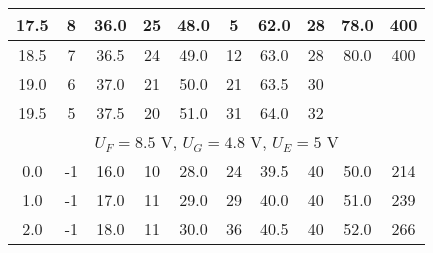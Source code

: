 \begin{table*}
\begin{ruledtabular}
\begin{tabular}{|cccccccccc|}
        \multicolumn{1}{|c|}{17.5}      & \multicolumn{1}{c|}{8}          & \multicolumn{1}{c|}{36.0}      & \multicolumn{1}{c|}{25}         & \multicolumn{1}{c|}{48.0}      & \multicolumn{1}{c|}{5}          & \multicolumn{1}{c|}{62.0}      & \multicolumn{1}{c|}{28}         & \multicolumn{1}{c|}{78.0}      & 400        \\ \hline
        \multicolumn{1}{|c|}{18.5}      & \multicolumn{1}{c|}{7}          & \multicolumn{1}{c|}{36.5}      & \multicolumn{1}{c|}{24}         & \multicolumn{1}{c|}{49.0}      & \multicolumn{1}{c|}{12}         & \multicolumn{1}{c|}{63.0}      & \multicolumn{1}{c|}{28}         & \multicolumn{1}{c|}{80.0}      & 400        \\ \hline
        \multicolumn{1}{|c|}{19.0}      & \multicolumn{1}{c|}{6}          & \multicolumn{1}{c|}{37.0}      & \multicolumn{1}{c|}{21}         & \multicolumn{1}{c|}{50.0}      & \multicolumn{1}{c|}{21}         & \multicolumn{1}{c|}{63.5}      & \multicolumn{1}{c|}{30}         & \multicolumn{1}{c|}{}          &            \\ \hline
        \multicolumn{1}{|c|}{19.5}      & \multicolumn{1}{c|}{5}          & \multicolumn{1}{c|}{37.5}      & \multicolumn{1}{c|}{20}         & \multicolumn{1}{c|}{51.0}      & \multicolumn{1}{c|}{31}         & \multicolumn{1}{c|}{64.0}      & \multicolumn{1}{c|}{32}         & \multicolumn{1}{c|}{}          &            \\ \hline
        \multicolumn{10}{|c|}{$U_F = 8.5$ V,   $U_{G} = 4.8$ V, $U_E=5$ V}                                                                                                                                                                                                                                                       \\ \hline
        \multicolumn{1}{|c|}{0.0}       & \multicolumn{1}{c|}{-1}         & \multicolumn{1}{c|}{16.0}      & \multicolumn{1}{c|}{10}         & \multicolumn{1}{c|}{28.0}      & \multicolumn{1}{c|}{24}         & \multicolumn{1}{c|}{39.5}      & \multicolumn{1}{c|}{40}         & \multicolumn{1}{c|}{50.0}      & 214        \\ \hline
        \multicolumn{1}{|c|}{1.0}       & \multicolumn{1}{c|}{-1}         & \multicolumn{1}{c|}{17.0}      & \multicolumn{1}{c|}{11}         & \multicolumn{1}{c|}{29.0}      & \multicolumn{1}{c|}{29}         & \multicolumn{1}{c|}{40.0}      & \multicolumn{1}{c|}{40}         & \multicolumn{1}{c|}{51.0}      & 239        \\ \hline
        \multicolumn{1}{|c|}{2.0}       & \multicolumn{1}{c|}{-1}         & \multicolumn{1}{c|}{18.0}      & \multicolumn{1}{c|}{11}         & \multicolumn{1}{c|}{30.0}      & \multicolumn{1}{c|}{36}         & \multicolumn{1}{c|}{40.5}      & \multicolumn{1}{c|}{40}         & \multicolumn{1}{c|}{52.0}      & 266        \\ \hline

\end{tabular}
\end{ruledtabular}
\end{table*}
